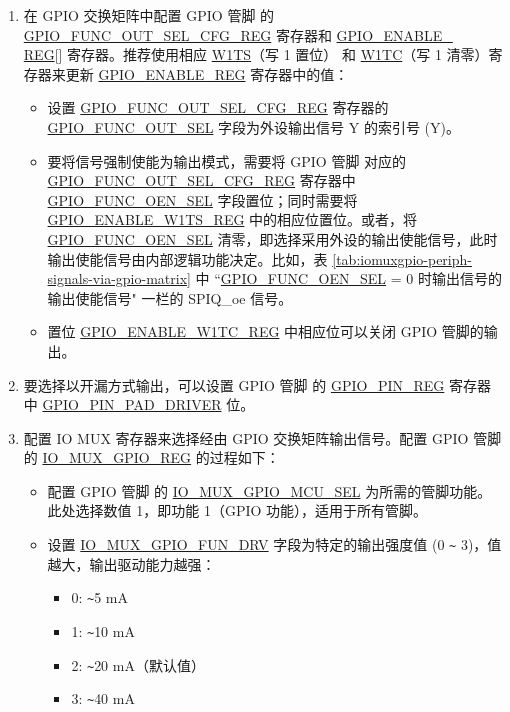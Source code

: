 \documentclass[main\_\_CN.tex]{subfiles}
\begin{document}
\begin{enumerate}
    \item 在 GPIO 交换矩阵中配置 GPIO 管脚  的 \hyperref[regdesc:GPIOFUNCNOUTSELCFGREG]{GPIO\_FUNC\_OUT\_SEL\_CFG\_REG} 寄存器和 \hyperref[regdesc:GPIOENABLEREG]{GPIO\_ENABLE\_\\REG}[] 寄存器。推荐使用相应 \hyperref[regdesc:GPIOENABLEW1TSREG]{W1TS}（写 1 置位） 和 \hyperref[regdesc:GPIOENABLEW1TCREG]{W1TC}（写 1 清零）寄存器来更新 \hyperref[regdesc:GPIOENABLEREG]{GPIO\_ENABLE\_REG} 寄存器中的值：


    \begin{itemize}
        \item 设置 \hyperref[regdesc:GPIOFUNCNOUTSELCFGREG]{GPIO\_FUNC\_OUT\_SEL\_CFG\_REG} 寄存器的 \hyperref[fielddesc:GPIOFUNCNOUTSEL]{GPIO\_FUNC\_OUT\_SEL} 字段为外设输出信号 Y 的索引号 (Y)。
        \item 要将信号强制使能为输出模式，需要将 GPIO 管脚   对应的 \hyperref[regdesc:GPIOFUNCNOUTSELCFGREG]{GPIO\_FUNC\_OUT\_SEL\_CFG\_REG} 寄存器中 \hyperref[fielddesc:GPIOFUNCNOENSEL]{GPIO\_FUNC\_OEN\_SEL} 字段置位；同时需要将 \hyperref[regdesc:GPIOENABLEW1TSREG]{GPIO\_ENABLE\_W1TS\_REG} 中的相应位置位。或者，将 \hyperref[fielddesc:GPIOFUNCNOENSEL]{GPIO\_FUNC\_OEN\_SEL} 清零，即选择采用外设的输出使能信号，此时输出使能信号由内部逻辑功能决定。比如，表 \ref{tab:iomuxgpio-periph-signals-via-gpio-matrix} 中 ``\hyperref[fielddesc:GPIOFUNCNOENSEL]{GPIO\_FUNC\_OEN\_SEL} = 0 时输出信号的输出使能信号" 一栏的 SPIQ\_oe 信号。
       \item 置位 \hyperref[regdesc:GPIOENABLEW1TCREG]{GPIO\_ENABLE\_W1TC\_REG} 中相应位可以关闭 GPIO 管脚的输出。
    \end{itemize}
    \item 要选择以开漏方式输出，可以设置 GPIO 管脚  的 \hyperref[regdesc:GPIOPINNREG]{GPIO\_PIN\_REG} 寄存器中 \hyperref[fielddesc:GPIOPINNPADDRIVER]{GPIO\_PIN\_PAD\_DRIVER} 位。
    \item 配置 IO MUX 寄存器来选择经由 GPIO 交换矩阵输出信号。配置 GPIO 管脚  的 \hyperref[regdesc:IOMUXGPIONREG]{IO\_MUX\_GPIO\_REG} 的过程如下：
    \begin{itemize}
        \item 配置 GPIO 管脚  的 \hyperref[fielddesc:IOMUXGPIONMCUSEL]{IO\_MUX\_GPIO\_MCU\_SEL} 为所需的管脚功能。此处选择数值 1，即功能 1（GPIO 功能），适用于所有管脚。
        \item 设置 \hyperref[fielddesc:IOMUXGPIONFUNDRV]{IO\_MUX\_GPIO\_FUN\_DRV} 字段为特定的输出强度值 (0 \verb+~+ 3)，值越大，输出驱动能力越强：
        \begin{itemize}
            \item 0: \verb+~+5 mA
            \item 1: \verb+~+10 mA
            \item 2: \verb+~+20 mA（默认值）
            \item 3: \verb+~+40 mA
        \end{itemize}


\end{itemize}
\end{enumerate}
\end{document}
